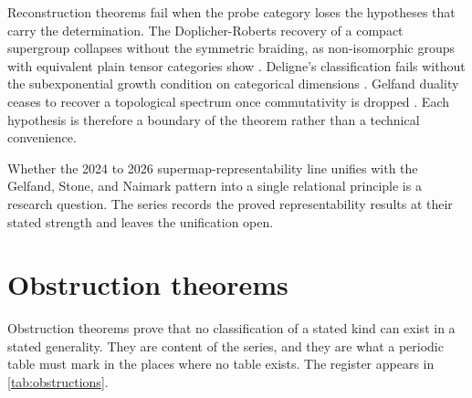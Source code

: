 \documentclass[11pt,letterpaper]{article}
\theoremstyle{definition}
\theoremstyle{remark}
\begin{document}
Reconstruction theorems fail when the probe category loses the hypotheses that carry the determination. The Doplicher-Roberts recovery of a compact supergroup collapses without the symmetric braiding, as non-isomorphic groups with equivalent plain tensor categories show \cite{corpus-74}. Deligne's classification fails without the subexponential growth condition on categorical dimensions \cite{corpus-13}. Gelfand duality ceases to recover a topological spectrum once commutativity is dropped \cite{corpus-43}. Each hypothesis is therefore a boundary of the theorem rather than a technical convenience.

Whether the 2024 to 2026 supermap-representability line \cite{corpus-40,corpus-41} unifies with the Gelfand, Stone, and Naimark pattern into a single relational principle is a research question. The series records the proved representability results at their stated strength and leaves the unification open.

\section{Obstruction theorems}

Obstruction theorems prove that no classification of a stated kind can exist in a stated generality. They are content of the series, and they are what a periodic table must mark in the places where no table exists. The register appears in \cref{tab:obstructions}.
\end{document}
